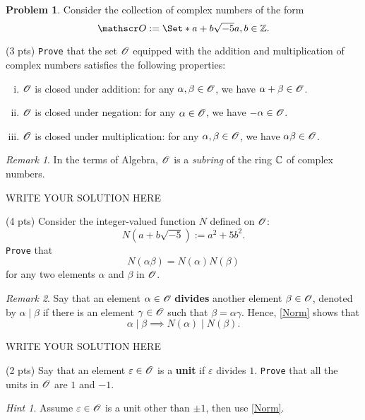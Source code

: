 \documentclass[11pt]{article}
\theoremstyle{plain}
\theoremstyle{definition}
\newtheorem{problem}{Problem}
\theoremstyle{remark}
\newtheorem*{remark}{Remark}
\newtheorem*{hint}{Hint}
\numberwithin{equation}{problem}
\providecommand\given{}
\begin{document}
\begin{problem}\label{p4}
	Consider the collection of complex numbers of the form
	\[
		\scrO := \Set*{	a+b\sqrt{-5}	\given	a,b\in\Z	}.
	\]
	\begin{listinprob}
		\item (3 pts) \texttt{Prove} that the set $\mathscr{O}$ equipped with the addition and multiplication of complex numbers satisfies the following properties:
		\begin{enumerate}[(i)]
			\item $\mathscr{O}$ is closed under addition: for any $\alpha,\beta\in\mathscr{O}$, we have $\alpha+\beta\in\mathscr{O}$.
			\item $\mathscr{O}$ is closed under negation: for any $\alpha\in\mathscr{O}$, we have $-\alpha\in\mathscr{O}$.
			\item $\mathscr{O}$ is closed under multiplication: for any $\alpha,\beta\in\mathscr{O}$, we have $\alpha\beta\in\mathscr{O}$.
		\end{enumerate}
		\begin{remark}
			In the terms of Algebra, $\mathscr{O}$ is a \emph{subring} of the ring $\mathbb{C}$ of complex numbers.
		\end{remark}		

\begin{solution} %
WRITE YOUR SOLUTION HERE
\end{solution}\clearpage %


		\item\label{Norm} (4 pts) Consider the integer-valued function $N$ defined on $\mathscr{O}$: 
		\[
			N(a+b\sqrt{-5}) := a^2+5b^2.
		\]
		\texttt{Prove} that 
		\[
			N(\alpha\beta) = N(\alpha)N(\beta)
		\]
		for any two elements $\alpha$ and $\beta$ in $\mathscr{O}$.
		\begin{remark}
			Say that an element $\alpha\in\mathscr{O}$ \textbf{divides} another element $\beta\in\mathscr{O}$, denoted by $\alpha\mid\beta$ if there is an element $\gamma\in\mathscr{O}$ such that $\beta=\alpha\gamma$. Hence, \cref{Norm} shows that 
			\[
				\alpha \mid \beta \implies N(\alpha) \mid N(\beta).
			\]
		\end{remark}		

\begin{solution} %
WRITE YOUR SOLUTION HERE
\end{solution}\clearpage %


		\item\label{unit} (2 pts) Say that an element $\varepsilon\in\mathscr{O}$ is a \textbf{unit} if $\varepsilon$ divides $1$. 
		\texttt{Prove} that all the units in $\mathscr{O}$ are $1$ and $-1$.
		\begin{hint}
			Assume $\varepsilon\in\mathscr{O}$ is a unit other than $\pm 1$, then use \cref{Norm}.
		\end{hint}


\end{listinprob}
\end{problem}
\end{document}
